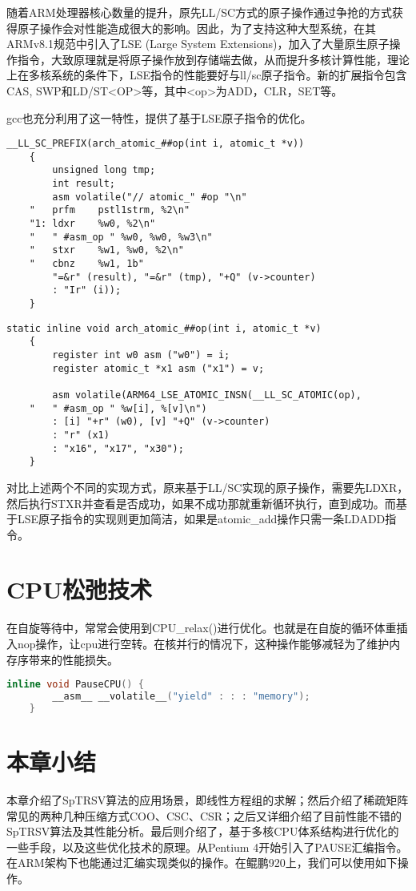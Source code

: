 随着ARM处理器核心数量的提升，原先LL/SC方式的原子操作通过争抢的方式获得原子操作会对性能造成很大的影响。因此，为了支持这种大型系统，在其ARMv8.1规范中引入了LSE (Large System Extensions)，加入了大量原生原子操作指令\cite{ArmArchitectureReference}，大致原理就是将原子操作放到存储端去做，从而提升多核计算性能，理论上在多核系统的条件下，LSE指令的性能要好与ll/sc原子指令。新的扩展指令包含CAS, SWP和LD/ST<OP>等，其中<op>为ADD，CLR，SET等。

gcc也充分利用了这一特性，提供了基于LSE原子指令的优化。

\begin{lstlisting}[caption={基于LL/SC的原子指令}]
    __LL_SC_PREFIX(arch_atomic_##op(int i, atomic_t *v))			
    {									
        unsigned long tmp;						
        int result;                               
        asm volatile("// atomic_" #op "\n"				
    "	prfm	pstl1strm, %2\n"    
    "1:	ldxr	%w0, %2\n"    
    "	" #asm_op "	%w0, %w0, %w3\n"     				
    "	stxr	%w1, %w0, %2\n"     
    "	cbnz	%w1, 1b"	   
        "=&r" (result), "=&r" (tmp), "+Q" (v->counter)	
        : "Ir" (i));
    }
\end{lstlisting}

\begin{lstlisting}[caption={基于LSE的原子指令}]
    static inline void arch_atomic_##op(int i, atomic_t *v)			
    {									
        register int w0 asm ("w0") = i;					
        register atomic_t *x1 asm ("x1") = v;				
                                        
        asm volatile(ARM64_LSE_ATOMIC_INSN(__LL_SC_ATOMIC(op),		
    "	" #asm_op "	%w[i], %[v]\n")					
        : [i] "+r" (w0), [v] "+Q" (v->counter) 				
        : "r" (x1)   					
        : "x16", "x17", "x30");  					
    }
\end{lstlisting}

对比上述两个不同的实现方式，原来基于LL/SC实现的原子操作，需要先LDXR，然后执行STXR并查看是否成功，如果不成功那就重新循环执行，直到成功。而基于LSE原子指令的实现则更加简洁，如果是atomic\_add操作只需一条LDADD指令。

\section{CPU松弛技术}

在自旋等待中，常常会使用到CPU\_relax()进行优化。也就是在自旋的循环体重插入nop操作，让cpu进行空转。在核并行的情况下，这种操作能够减轻为了维护内存序带来的性能损失。

\begin{lstlisting}[language=c++]
    inline void PauseCPU() { 
        __asm__ __volatile__("yield" : : : "memory"); 
    }
\end{lstlisting}

\section{本章小结}

本章介绍了SpTRSV算法的应用场景，即线性方程组的求解；然后介绍了稀疏矩阵常见的两种几种压缩方式COO、CSC、CSR；之后又详细介绍了目前性能不错的SpTRSV算法及其性能分析。最后则介绍了，基于多核CPU体系结构进行优化的一些手段，以及这些优化技术的原理。从Pentium 4开始引入了PAUSE汇编指令。在ARM架构下也能通过汇编实现类似的操作。在鲲鹏920上，我们可以使用如下操作。





\endinput